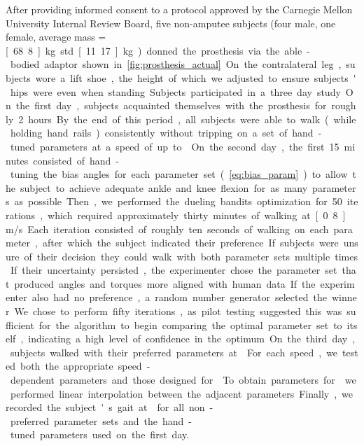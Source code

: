 After providing informed consent to a protocol approved by the Carnegie Mellon
University Internal Review Board, five non-amputee subjects (four male, one
female, average mass = \unit[68.8]{kg} std \unit[11.17]{kg}) donned the
prosthesis via the able-bodied adaptor shown in \cref{fig:prosthesis_actual}. On
the contralateral leg, subjects wore a lift shoe, the height of which we
adjusted to ensure subjects' hips were even when standing.

Subjects participated in a three day study. On the first day, subjects
acquainted themselves with the prosthesis for roughly 2 hours. By the end of
this period, all subjects were able to walk (while holding hand rails)
consistently without tripping on a set of hand-tuned parameters at a speed of up
to . On the second day, the first 15 minutes consisted of
hand-tuning the bias angles for each parameter set (\cref{eq:bias_param}) to
allow the subject to achieve adequate ankle and knee flexion for as many
parameters as possible. Then, we performed the dueling bandits optimization for
50 iterations, which required approximately thirty minutes of walking at
\unit[0.8]{m/s}. Each iteration consisted of roughly ten seconds of walking on
each parameter, after which the subject indicated their preference. If subjects
were unsure of their decision they could walk with both parameter sets multiple
times. If their uncertainty persisted, the experimenter chose the parameter set
that produced angles and torques more aligned with human data.  If the
experimenter also had no preference, a random number generator selected the
winner. We chose to perform fifty iterations, as pilot testing suggested this
was sufficient for the algorithm to begin comparing the optimal parameter set to
itself, indicating a high level of confidence in the optimum.

On the third day, subjects walked with their preferred parameters at
. For each speed, we tested both the
appropriate speed-dependent parameters and those designed for
. To obtain parameters for  we
performed linear interpolation between the adjacent parameters.  Finally, we
recorded the subject's gait at  for all non-preferred
parameter sets and the hand-tuned parameters used on the first day. 
